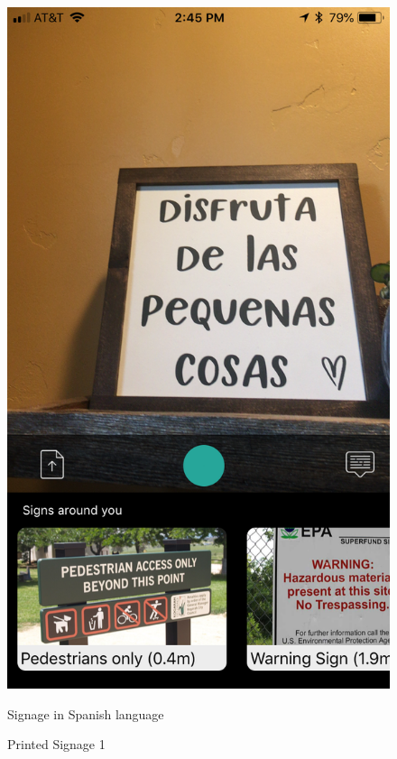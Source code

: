 \documentclass[12pt]{article}
\begin{document}
 \begin{figure} [H]
\centering
\begin{minipage}{.5\textwidth}
  \centering
  \includegraphics[width=0.9\linewidth]{media/1.png}
  \caption{Printed Signage 1}{Signage in Spanish language}
  \label{fig:case3in}
\end{minipage}%
\begin{minipage}{.5\textwidth}
  \centering

\end{minipage}
\end{figure}
\end{document}
